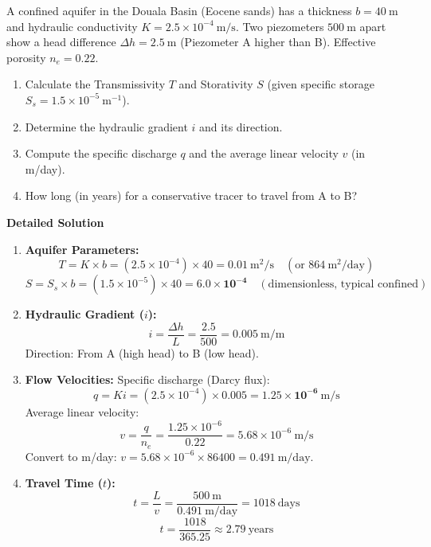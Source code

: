 \documentclass[11pt]{article}
\begin{document}
\begin{exoresolu}
A confined aquifer in the Douala Basin (Eocene sands) has a thickness $b = 40\ \mathrm{m}$ and hydraulic conductivity $K = 2.5 \times 10^{-4}\ \mathrm{m/s}$. Two piezometers $500\ \mathrm{m}$ apart show a head difference $\Delta h = 2.5\ \mathrm{m}$ (Piezometer A higher than B). Effective porosity $n_e = 0.22$.
\begin{enumerate}
    \item Calculate the Transmissivity $T$ and Storativity $S$ (given specific storage $S_s = 1.5 \times 10^{-5}\ \mathrm{m^{-1}}$).
    \item Determine the hydraulic gradient $i$ and its direction.
    \item Compute the specific discharge $q$ and the average linear velocity $v$ (in m/day).
    \item How long (in years) for a conservative tracer to travel from A to B?
\end{enumerate}
\tcblower
\textbf{Detailed Solution}
\begin{enumerate}
    \item \textbf{Aquifer Parameters:}
    \[ T = K \times b = (2.5 \times 10^{-4}) \times 40 = \mathbf{0.01\ \mathrm{m^2/s}} \quad (\text{or } 864\ \mathrm{m^2/day}) \]
    \[ S = S_s \times b = (1.5 \times 10^{-5}) \times 40 = \mathbf{6.0 \times 10^{-4}} \quad (\text{dimensionless, typical confined}) \]
    \item \textbf{Hydraulic Gradient ($i$):}
    \[ i = \frac{\Delta h}{L} = \frac{2.5}{500} = \mathbf{0.005\ \mathrm{m/m}} \]
    Direction: From A (high head) to B (low head).
    \item \textbf{Flow Velocities:}
    Specific discharge (Darcy flux):
    \[ q = K i = (2.5 \times 10^{-4}) \times 0.005 = \mathbf{1.25 \times 10^{-6}\ \mathrm{m/s}} \]
    Average linear velocity:
    \[ v = \frac{q}{n_e} = \frac{1.25 \times 10^{-6}}{0.22} = 5.68 \times 10^{-6}\ \mathrm{m/s} \]
    Convert to m/day: $v = 5.68 \times 10^{-6} \times 86400 = \mathbf{0.491\ \mathrm{m/day}}$.
    \item \textbf{Travel Time ($t$):}
    \[ t = \frac{L}{v} = \frac{500\ \mathrm{m}}{0.491\ \mathrm{m/day}} = 1018\ \mathrm{days} \]
    \[ t = \frac{1018}{365.25} \approx \mathbf{2.79\ \mathrm{years}} \]
\end{enumerate}
\end{exoresolu}
\end{document}
